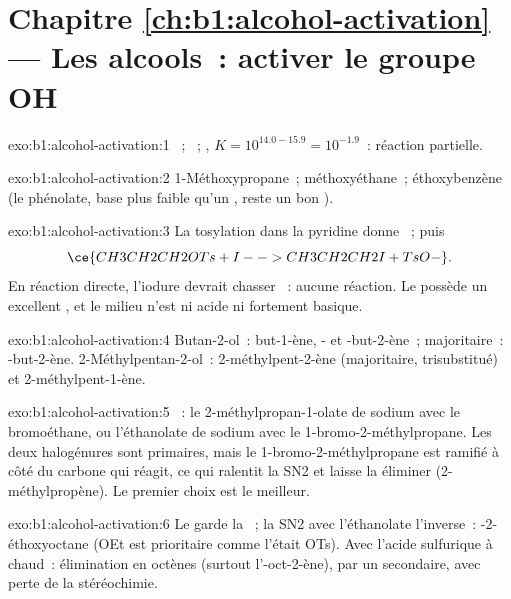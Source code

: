 \section*{Chapitre \ref{ch:b1:alcohol-activation} --- Les alcools~: activer le groupe OH}

\begin{solution}{exo:b1:alcohol-activation:1}
~;
~;
, $K = 10^{14.0 - 15.9} = 10^{-1.9}$~:
réaction partielle.
\end{solution}

\begin{solution}{exo:b1:alcohol-activation:2}
1-Méthoxypropane~; méthoxyéthane~; éthoxybenzène (le phénolate, base plus
faible qu'un , reste un bon ).
\end{solution}

\begin{solution}{exo:b1:alcohol-activation:3}
La tosylation dans la pyridine donne ~; puis
\[ \ce{CH3CH2CH2OTs + I- -> CH3CH2CH2I + TsO-}. \] En réaction directe,
l'iodure devrait chasser ~: aucune réaction. Le  possède
un excellent , et le milieu n'est ni acide ni fortement
basique.
\end{solution}

\begin{solution}{exo:b1:alcohol-activation:4}
Butan-2-ol~: but-1-ène, - et -but-2-ène~; majoritaire~:
-but-2-ène. 2-Méthylpentan-2-ol~: 2-méthylpent-2-ène (majoritaire,
trisubstitué) et 2-méthylpent-1-ène.
\end{solution}

\begin{solution}{exo:b1:alcohol-activation:5}
~: le 2-méthylpropan-1-olate de sodium avec le
bromoéthane, ou l'éthanolate de sodium avec le 1-bromo-2-méthylpropane.
Les deux halogénures sont primaires, mais le 1-bromo-2-méthylpropane est
ramifié à côté du carbone qui réagit, ce qui ralentit la SN2 et laisse la
 éliminer (2-méthylpropène). Le premier choix est le meilleur.
\end{solution}

\begin{solution}{exo:b1:alcohol-activation:6}
Le  garde la  ~; la SN2 avec l'éthanolate
l'inverse~: -2-éthoxyoctane (OEt est prioritaire comme l'était
OTs). Avec l'acide sulfurique à chaud~: élimination en octènes
(surtout l'-oct-2-ène), par un  secondaire, avec perte
de la stéréochimie.
\end{solution}

